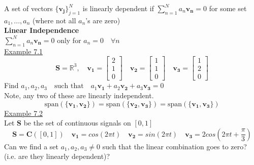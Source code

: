 \documentclass[12pt]{article}
\begin{document}
A set of vectors $\{\mathbf{v_j}\}_{j=1}^N$ is linearly dependent if $\sum_{n=1}^N a_n\mathbf{v_n}=0$ for some set $a_1,...,a_n$ (where not all $a_n$'s are zero) \\
\newline
\color{ForestGreen}
\large{\textbf{Linear Independence}}
\color{Black}\\
$\sum_{n=1}^N a_n\mathbf{v_n}=0$ only for $a_n=0 \quad \forall n$ \\
\newline
\underline{Example 7.1} \\
\begin{equation*}
    \mathbf{S} = \mathbb{R}^3, \quad \mathbf{v_1} =
    \begin{bmatrix}
            2 \\
            1 \\
            0
    \end{bmatrix}
    \quad \mathbf{v_2} =
    \begin{bmatrix}
            1 \\
            1 \\
            0
    \end{bmatrix}
    \quad \mathbf{v_3} =
    \begin{bmatrix}
            1 \\
            2 \\
            0
    \end{bmatrix}
\end{equation*}
Find $a_1, a_2, a_3 \quad \text{such that} \quad a_1\mathbf{v_1} + a_2\mathbf{v_2} + a_3\mathbf{v_3} = 0$ \\
Note, any two of these are linearly independent. \\
\begin{equation*}
    \text{span}(\{\mathbf{v_1}, \mathbf{v_2}\}) = \text{span}(\{\mathbf{v_2}, \mathbf{v_3}\}) = \text{span}(\{\mathbf{v_1}, \mathbf{v_3}\})     
\end{equation*}
\underline{Example 7.2} \\
Let \textbf{S} be the set of continuous signals on $[0,1]$
\begin{equation*}
    \mathbf{S} = \mathbf{C}([0,1]) \quad \mathbf{v_1} = cos(2\pi t) \quad \mathbf{v_2} = sin(2\pi t) \quad \mathbf{v_3} = 2cos(2\pi t + \frac{\pi}{3}) 
\end{equation*}
Can we find a set $a_1, a_2, a_3 \neq 0$ such that the linear combination goes to zero? (i.e. are they linearly dependent)?\\
\end{document}
